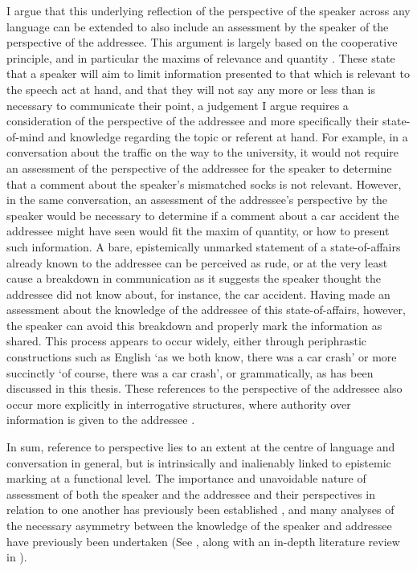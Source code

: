 I argue that this underlying reflection of the perspective of the speaker across any language can be extended to also include an assessment by the speaker of the perspective of the addressee. This argument is largely based on the cooperative principle, and in particular the maxims of relevance and quantity \cite{Grice1989}. These state that a speaker will aim to limit information presented to that which is relevant to the speech act at hand, and that they will not say any more or less than is necessary to communicate their point, a judgement I argue requires a consideration of the perspective of the addressee and more specifically their state-of-mind and knowledge regarding the topic or referent at hand. For example, in a conversation about the traffic on the way to the university, it would not require an assessment of the perspective of the addressee for the speaker to determine that a comment about the speaker's mismatched socks is not relevant. However, in the same conversation, an assessment of the addressee's perspective by the speaker would be necessary to determine if a comment about a car accident the addressee might have seen would fit the maxim of quantity, or how to present such information. A bare, epistemically unmarked statement of a state-of-affairs already known to the addressee can be perceived as rude, or at the very least cause a breakdown in communication as it suggests the speaker thought the addressee did not know about, for instance, the car accident. Having made an assessment about the knowledge of the addressee of this state-of-affairs, however, the speaker can avoid this breakdown and properly mark the information as shared. This process appears to occur widely, either through periphrastic constructions such as English `as we both know, there was a car crash' or more succinctly `of course, there was a car crash', or grammatically, as has been discussed in this thesis. These references to the perspective of the addressee also occur more explicitly in interrogative structures, where authority over information is given to the addressee \cite{Hill2020}.

In sum, reference to perspective lies to an extent at the centre of language and conversation in general, but is intrinsically and inalienably linked to epistemic marking at a functional level. The importance and unavoidable nature of assessment of both the speaker and the addressee and their perspectives in relation to one another has previously been established \cite{Heritage2012}, and many analyses of the necessary asymmetry between the knowledge of the speaker and addressee have previously been undertaken (See , along with an in-depth literature review in ). 

